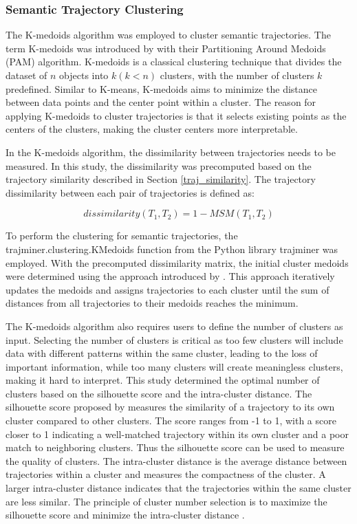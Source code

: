 \documentclass{article}
\theoremstyle{remark}
\begin{document}
\subsubsection{Semantic Trajectory Clustering}
The K-medoids algorithm was employed to cluster semantic trajectories. The term K-medoids was introduced by \cite{kaufman_partitioning_1990} with their Partitioning Around Medoids (PAM) algorithm. K-medoids is a classical clustering technique that divides the dataset of $n$ objects into $k (k<n)$ clusters, with the number of clusters $k$ predefined. Similar to K-means, K-medoids aims to minimize the distance between data points and the center point within a cluster. The reason for applying K-medoids to cluster trajectories is that it selects existing points as the centers of the clusters, making the cluster centers more interpretable.

In the K-medoids algorithm, the dissimilarity between trajectories needs to be measured. In this study, the dissimilarity was precomputed based on the trajectory similarity described in Section \ref{traj_similarity}. The trajectory dissimilarity between each pair of trajectories is defined as:

\begin{equation} \label{eq:dissimilarity}
    dissimilarity(T_{1},T_{2}) = 1-MSM(T_{1},T_{2})
\end{equation}

To perform the clustering for semantic trajectories, the trajminer.clustering.KMedoids function from the Python library trajminer was employed. With the precomputed dissimilarity matrix, the initial cluster medoids were determined using the approach introduced by \cite{park_simple_2009}. This approach iteratively updates the medoids and assigns trajectories to each cluster until the sum of distances from all trajectories to their medoids reaches the minimum.

The K-medoids algorithm also requires users to define the number of clusters as input. Selecting the number of clusters is critical as too few clusters will include data with different patterns within the same cluster, leading to the loss of important information, while too many clusters will create meaningless clusters, making it hard to interpret. This study determined the optimal number of clusters based on the silhouette score and the intra-cluster distance. The silhouette score proposed by \cite{rousseeuw_silhouettes_1987} measures the similarity of a trajectory to its own cluster compared to other clusters. The score ranges from -1 to 1, with a score closer to 1 indicating a well-matched trajectory within its own cluster and a poor match to neighboring clusters. Thus the silhouette score can be used to measure the quality of clusters. The intra-cluster distance is the average distance between trajectories within a cluster and measures the compactness of the cluster. A larger intra-cluster distance indicates that the trajectories within the same cluster are less similar. The principle of cluster number selection is to maximize the silhouette score and minimize the intra-cluster distance \citep{van_der_merwe_data_2003}.
\end{document}

